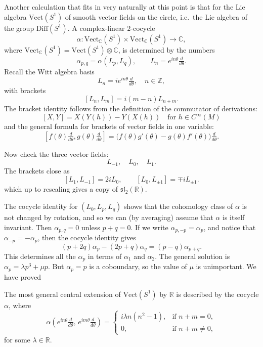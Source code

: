 \documentclass[12pt]{article}
\begin{document}
Another calculation that fits in very naturally at this point is that for the
Lie algebra $\mathrm{Vect}(S^1)$ of smooth vector fields on the circle, i.e.\ the Lie algebra of the group $\mathrm{Diff}(S^1)$. A complex-linear $2$-cocycle
\[
    \alpha : \mathrm{Vect}_{\mathbb{C}}(S^1) \times \mathrm{Vect}_{\mathbb{C}}(S^1) \to \mathbb{C},
\]
where $\mathrm{Vect}_{\mathbb{C}}(S^1) = \mathrm{Vect}(S^1)\otimes \mathbb{C}$, is determined by the numbers
\[
    \alpha_{p,q} = \alpha(L_p,L_q), \qquad L_n = e^{in\theta}\tfrac{d}{d\theta}.
\]
Recall the Witt algebra basis
\[
    L_n = i e^{in\theta} \tfrac{d}{d\theta}, \quad n \in \mathbb{Z},
\]
with brackets
\[
    [L_n, L_m] = i(m-n) L_{n+m}.
\] The bracket identity follows from the definition of the commutator of derivations:
\[
    [X,Y] = X(Y(h)) - Y(X(h)) \quad \text{for } h \in C^\infty(M)
\] and the general formula for brackets of vector fields in one variable:
\[[f(\theta)\tfrac{d}{d\theta}, g(\theta)\tfrac{d}{d\theta}] = \big(f(\theta)g'(\theta) - g(\theta)f'(\theta)\big)\tfrac{d}{d\theta}.\]

Now check the three vector fields:
\[
    L_{-1}, \quad L_0, \quad L_1.
\]
The brackets close as
\[
    [L_1, L_{-1}] = 2i L_0, \qquad [L_0, L_{\pm 1}] = \mp i L_{\pm 1}.
\]
which up to rescaling gives a copy of $\mathfrak{sl}_2(\mathbb{R})$.

The cocycle identity for $(L_0,L_p,L_q)$ shows that the cohomology class of
$\alpha$ is not changed by rotation, and so we can (by averaging) assume that
$\alpha$ is itself invariant. Then $\alpha_{p,q}=0$ unless $p+q=0$. If we write
$\alpha_{p,-p}=\alpha_p$, and notice that $\alpha_{-p}=-\alpha_p$, then the cocycle
identity gives
\[
    (p+2q)\alpha_p - (2p+q)\alpha_q = (p-q)\alpha_{p+q}.
\]
This determines all the $\alpha_p$ in terms of $\alpha_1$ and $\alpha_2$. The general
solution is $\alpha_p = \lambda p^3 + \mu p$. But $\alpha_p = p$ is a coboundary, so the
value of $\mu$ is unimportant. We have proved

\begin{proposition}
    The most general central extension of $\mathrm{Vect}(S^1)$ by $\mathbb{R}$
    is described by the cocycle $\alpha$, where
    \[
        \alpha\!\left(e^{in\theta}\tfrac{d}{d\theta},\, e^{im\theta}\tfrac{d}{d\theta}\right)
        = \begin{cases}
            i\lambda n(n^2-1), & \text{if } n+m=0,      \\
            0,                 & \text{if } n+m \neq 0,
        \end{cases}
    \]
    for some $\lambda \in \mathbb{R}$.
\end{proposition}
\end{document}
